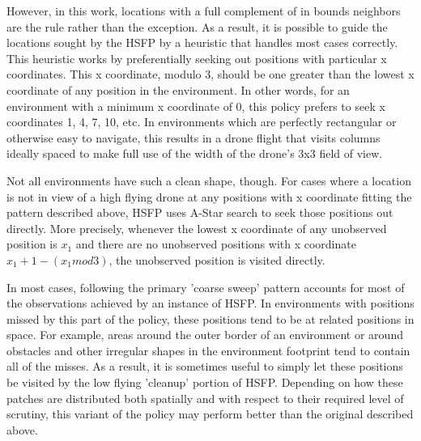 However, in this work, locations with a full complement of in bounds neighbors are the rule rather than the exception. As a result, it is possible to guide the locations sought by the HSFP by a heuristic that handles most cases correctly. This heuristic works by preferentially seeking out positions with particular x coordinates. This x coordinate, modulo 3, should be one greater than the lowest x coordinate of any position in the environment. In other words, for an environment with a minimum x coordinate of 0, this policy prefers to seek x coordinates 1, 4, 7, 10, etc. In environments which are perfectly rectangular or otherwise easy to navigate, this results in a drone flight that visits columns ideally spaced to make full use of the width of the drone's 3x3 field of view.

Not all environments have such a clean shape, though. For cases where a location is not in view of a high flying drone at any positions with x coordinate fitting the pattern described above, HSFP uses A-Star search to seek those positions out directly. More precisely, whenever the lowest x coordinate of any unobserved position is $x_1$ and there are no unobserved positions with x coordinate $x_1 + 1 - (x_1 mod 3)$, the unobserved position is visited directly. 

In most cases, following the primary 'coarse sweep' pattern accounts for most of the observations achieved by an instance of HSFP. In environments with positions missed by this part of the policy, these positions tend to be at related positions in space. For example, areas around the outer border of an environment or around obstacles and other irregular shapes in the environment footprint tend to contain all of the misses. As a result, it is sometimes useful to simply let these positions be visited by the low flying 'cleanup' portion of HSFP. Depending on how these patches are distributed both spatially and with respect to their required level of scrutiny, this variant of the policy may perform better than the original described above.